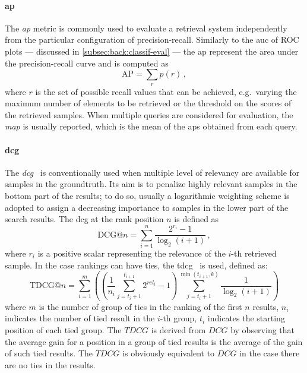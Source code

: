 \paragraph{\acrlong{ap}}
The \emph{\acrfull{ap}} metric is commonly used to evaluate a retrieval system independently from the particular configuration of precision-recall.
Similarly to the \acrfull{auc} of ROC plots --- discussed in \ref{subsec:back:classif-eval} --- the \gls{ap} represent the area under the precision-recall curve and is computed as
\begin{equation} \label{eq:back:ap}
    \mathrm{AP} = \sum_r p(r)\,,
\end{equation}
where $r$ is the set of possible recall values that can be achieved, e.g.\ varying the maximum number of elements to be retrieved or the threshold on the scores of the retrieved samples.
When multiple queries are considered for evaluation, the \emph{\acrfull{map}} is usually reported, which is the mean of the \glspl{ap} obtained from each query.

\paragraph{\acrlong{dcg}}
The \emph{\acrfull{dcg}}~\cite{jarvelin2002cumulated} is conventionally used when multiple level of relevancy are available for samples in the groundtruth.
Its aim is to penalize highly relevant samples in the bottom part of the results;
to do so, usually a logarithmic weighting scheme is adopted to assign a decreasing importance to samples in the lower part of the search results.
The \gls{dcg} at the rank position $n$ is defined as
\begin{equation} \label{eq:back:dcg}
    \mathrm{DCG}@n = \sum_{i=1}^n \frac{2^{r_i} - 1}{\log_2(i + 1)} \,,
\end{equation}
where $r_i$ is a positive scalar representing the relevance of the $i$-th retrieved sample.
In the case rankings can have ties, the \gls{tdcg}~\cite{mcsherry2008computing} is used, defined as:
%
\begin{equation}
\mathrm{TDCG}@n = \sum_{i=1}^{m}\left(\left(\frac{1}{n_i}\sum_{j=t_i+1}^{t_{i+1}}2^{rel_i}-1\right)\sum_{j=t_i+1}^{\min(t_{i+1},k)}\frac{1}{\log_2(i+1)}\right)
\end{equation}
%
where $m$ is the number of group of ties in the ranking of the first $n$ results, $n_i$ indicates the number of tied result in the $i$-th group, $t_i$ indicates the starting position of each tied group.
The $TDCG$ is derived from $DCG$ by observing that the average gain for a position in a group of tied results is the average of the gain of such tied results.
The $TDCG$ is obviously equivalent to $DCG$ in the case there are no ties in the results.

